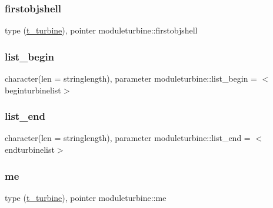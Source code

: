 \subsubsection{\texorpdfstring{firstobjshell}{firstobjshell}}
{\footnotesize\ttfamily type (\mbox{\hyperlink{structmoduleturbine_1_1t__turbine}{t\+\_\+turbine}}), pointer moduleturbine\+::firstobjshell\hspace{0.3cm}{\ttfamily [private]}}

\mbox{\label{namespacemoduleturbine_ad04636802bac2f3c19dff855eca9c9dc}} 
\subsubsection{\texorpdfstring{list\+\_\+begin}{list\_begin}}
{\footnotesize\ttfamily character(len = stringlength), parameter moduleturbine\+::list\+\_\+begin = \textquotesingle{}$<$beginturbinelist$>$\textquotesingle{}\hspace{0.3cm}{\ttfamily [private]}}

\mbox{\label{namespacemoduleturbine_a9c4747fd12e7bf415c89aca4386a391e}} 
\subsubsection{\texorpdfstring{list\+\_\+end}{list\_end}}
{\footnotesize\ttfamily character(len = stringlength), parameter moduleturbine\+::list\+\_\+end = \textquotesingle{}$<$endturbinelist$>$\textquotesingle{}\hspace{0.3cm}{\ttfamily [private]}}

\mbox{\label{namespacemoduleturbine_a49ad1250ab40f9f964278793bcff42e0}} 
\subsubsection{\texorpdfstring{me}{me}}
{\footnotesize\ttfamily type (\mbox{\hyperlink{structmoduleturbine_1_1t__turbine}{t\+\_\+turbine}}), pointer moduleturbine\+::me\hspace{0.3cm}{\ttfamily [private]}}


